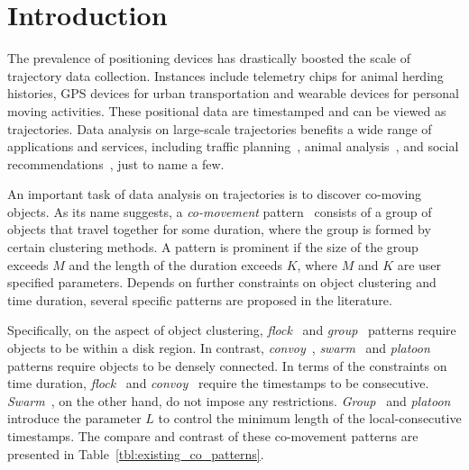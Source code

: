 \section{Introduction}
The prevalence of positioning devices has drastically boosted the scale of trajectory data collection. 
Instances include telemetry chips for animal herding histories, 
GPS devices for urban transportation and wearable devices for personal moving activities. 
These positional data are timestamped and can be viewed as trajectories. 
Data analysis on large-scale trajectories benefits a wide range of applications and services, including traffic planning~\cite{zheng2011urban}, animal analysis~\cite{li2010miningperiodic}, and social recommendations~\cite{bao2013survey}, just to name a few.%

An important task of data analysis on trajectories is to discover co-moving objects. 
As its name suggests, a \emph{co-movement} pattern~\cite{li2013managing} consists 
of a group of objects that travel together for some duration, where the group is formed
by certain clustering methods. A pattern is prominent 
if the size of the group exceeds $M$ and the length of the duration exceeds $K$, where $M$ and $K$
are user specified parameters. Depends on further constraints on object clustering
and time duration, several specific patterns are proposed in the literature. 

Specifically, on the aspect of object clustering, \emph{flock}~\cite{gudmundsson2006flock} and \emph{group}~\cite{wang2006grouppattern} patterns require objects to be within a disk region.
In contrast, \emph{convoy}~\cite{jeung2008convoy}, \emph{swarm}~\cite{li2010swarm} and
\emph{platoon}~\cite{li2015platoon} patterns require objects to be densely connected. 
In terms of the constraints on time duration, \emph{flock}~\cite{gudmundsson2006flock} and \emph{convoy}~\cite{jeung2008convoy}
require the timestamps to be consecutive. \emph{Swarm}~\cite{li2010swarm}, on the
other hand, do not impose any restrictions. \emph{Group}~\cite{wang2006grouppattern} 
and \emph{platoon}~\cite{li2015platoon} introduce the parameter $L$ to control the minimum length of the local-consecutive
timestamps. 
The compare and contrast of these co-movement patterns are presented in Table~\ref{tbl:existing_co_patterns}.



